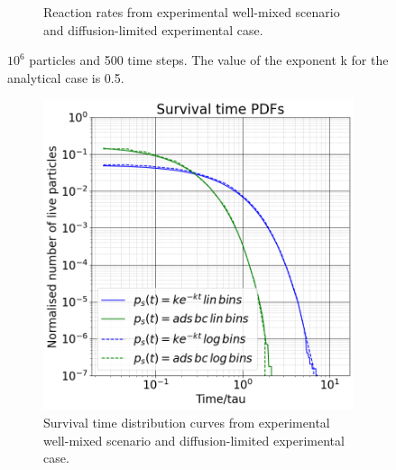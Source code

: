 \documentclass{article}
\begin{document}
\begin{figure}[htbp]
\begin{subfigure}[b]{0.45\textwidth}
        \caption{Reaction rates from experimental well-mixed scenario and diffusion-limited experimental case.}
    \end{subfigure}
    \caption{$10^6$ particles and 500 time steps. The value of the exponent k for the analytical case is 0.5.}
    \label{fig:survTimeAndRates}
\end{figure}

\begin{figure}[htbp]
    \centering
    \begin{subfigure}[b]{0.45\textwidth}
        \centering
        \includegraphics[width=\textwidth]{images/survTimeDistCompareNorm.png}
        \caption{Survival time distribution curves from experimental well-mixed scenario and diffusion-limited experimental case.}
    \end{subfigure}
    \hfill
    \begin{subfigure}[b]{0.45\textwidth}
        \centering

\end{subfigure}
\end{figure}
\end{document}
